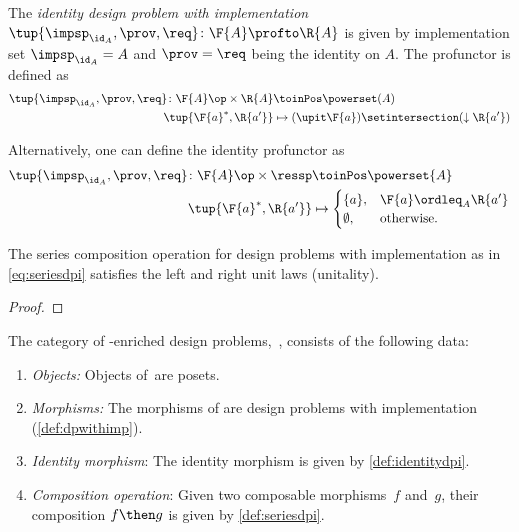 \begin{definition}
    \label{def:identitydpi}
    The \emph{identity design problem with implementation}~$\tup{\impsp_{\id_A},\prov,\req} \colon \F{A} \profto \R{A}$ is given by implementation set $\impsp_{\id_A} = A$ and $\prov=\req$ being the identity on $A$.
    The profunctor is defined as
    \begin{align}
        \tup{\impsp_{\id_A},\prov,\req} \colon \F{A}\op \times \R{A} & \toinPos \powerset(A)                                      \\
        \tup{\F{a}^*,\R{a'}}                                         & \mapsto (\upit \F{a}) \setintersection (\downarrow \R{a'})
    \end{align}
\end{definition}
\begin{remark}
    Alternatively, one can define the identity profunctor as
    \begin{align}
        \tup{\impsp_{\id_A},\prov,\req}\colon \F{A}\op \times \ressp & \toinPos \powerset{A} \\
        \tup{\F{a}^*,\R{a'}}                                         & \mapsto
        \begin{cases}
            \{a\},     & \F{a}\ordleq_A \R{a'} \\
            \emptyset, & \text{otherwise}.
        \end{cases}
    \end{align}
\end{remark}

\begin{lemma}
    The series composition operation for design problems with implementation as in \cref{eq:seriesdpi} satisfies the left and right unit laws (unitality).
\end{lemma}

\begin{proof}
\end{proof}

\begin{definition}
    The category of \Set-enriched design problems,~\DPI, consists of the following data:
    \begin{enumerate}
        \item \emph{Objects:}
              Objects of~\DPI are posets.
        \item \emph{Morphisms:}
              The morphisms of \DPI are design problems with implementation (\cref{def:dpwithimp}).
        \item \emph{Identity morphism}: The identity morphism is given by \cref{def:identitydpi}.
        \item \emph{Composition operation}: Given two composable morphisms~$f$ and~$g$, their composition $f\then g$ is given by \cref{def:seriesdpi}.
    \end{enumerate}
\end{definition}

